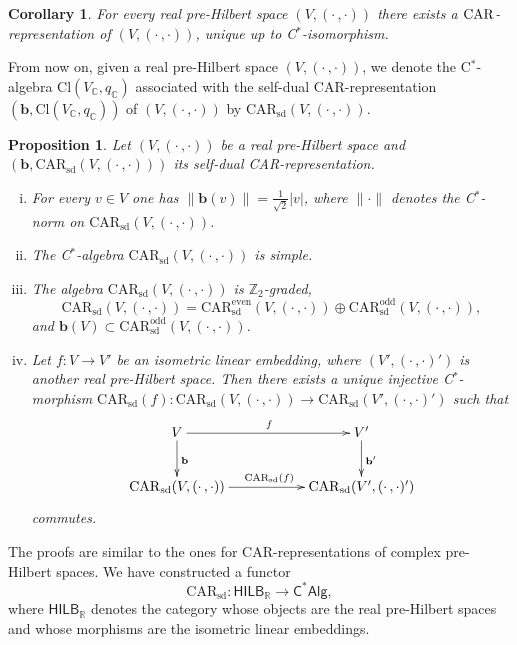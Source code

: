 \documentclass[a4paper,11pt]{amsart}
\newtheorem{cor}[thm]{Corollary}
\newtheorem{prop}[thm]{Proposition}
\theoremstyle{definition}
\begin{document}
\begin{cor}\label{csdCAR}
For every real pre-Hilbert space $(V,(\cdot\,,\cdot))$ there exists a ${\rm CAR}$-representation of $(V,(\cdot\,,\cdot))$, unique up to {\mbox{C$^*$}}-isomorphism.
\end{cor}

From now on, given a real pre-Hilbert space $(V,(\cdot\,,\cdot))$, we denote  the {\mbox{C$^*$}}-algebra $\mathrm{Cl}(V_{\mathbb{C}},q_{\mathbb{C}})$ associated with the self-dual $\mathrm{CAR}$-representation $({\mathbf{b}},\mathrm{Cl}(V_{\mathbb{C}},q_{\mathbb{C}}))$ of $(V,(\cdot\,,\cdot))$ by $\mathrm{CAR}_\mathrm{sd}(V,(\cdot\,,\cdot))$.

\begin{prop}\label{psdCAR}
Let $(V,(\cdot\,,\cdot))$ be a real pre-Hilbert space and  $({\mathbf{b}},\mathrm{CAR}_\mathrm{sd}(V,(\cdot\,,\cdot)))$ its self-dual {\rm CAR}-representation.
\begin{enumerate}[(i)]
\item\label{psdCAR:1}
For every $v\in V$ one has $\|{\mathbf{b}}(v)\|=\frac{1}{\sqrt 2}|v|$, where $\|\cdot\|$ denotes the {\mbox{C$^*$}}-norm on $\mathrm{CAR}_\mathrm{sd}(V,(\cdot\,,\cdot))$.
\item \label{psdCAR:2}
The {\mbox{C$^*$}}-algebra $\mathrm{CAR}_\mathrm{sd}(V,(\cdot\,,\cdot))$ is simple.
\item \label{psdCAR:4}
The algebra $\mathrm{CAR}_\mathrm{sd}(V,(\cdot\,,\cdot))$ is ${\mathbb{Z}}_2$-graded, 
$$
\mathrm{CAR}_\mathrm{sd}(V,(\cdot\,,\cdot))=\mathrm{CAR}^\mathrm{even}_\mathrm{sd}(V,(\cdot\,,\cdot))\oplus\mathrm{CAR}^\mathrm{odd}_\mathrm{sd}(V,(\cdot\,,\cdot)),
$$ 
and ${\mathbf{b}}(V) \subset \mathrm{CAR}^\mathrm{odd}_\mathrm{sd}(V,(\cdot\,,\cdot))$.
\item \label{psdCAR:3}
Let $f:V\to V'$ be an isometric linear embedding, where $(V',(\cdot\,,\cdot)')$ is another real pre-Hilbert space.
Then there exists a unique injective {\mbox{C$^*$}}-morphism $\mathrm{CAR}_\mathrm{sd}(f):\mathrm{CAR}_\mathrm{sd}(V,(\cdot\,,\cdot))\to\mathrm{CAR}_\mathrm{sd}(V',(\cdot\,,\cdot)')$ such that 
$$
\xymatrix{
V\ar[rr]^{f}\ar[d]^{\mathbf{b}}
&&V' \ar[d]^{{\mathbf{b}}'}\\
\mathrm{CAR}_\mathrm{sd}(V,(\cdot\,,\cdot))\ar[rr]^{\mathrm{CAR}_\mathrm{sd}(f)}
&&\mathrm{CAR}_\mathrm{sd}(V',(\cdot\,,\cdot)')
}
$$
commutes.
\end{enumerate}
\end{prop}

The proofs are similar to the ones for CAR-representations of complex pre-Hilbert spaces.
We have constructed a functor
\[\mathrm{CAR}_\mathrm{sd}:{\mathsf{HILB}_{\mathbb{R}}}\longrightarrow{\mathsf{C^*Alg}},\]
where ${\mathsf{HILB}_{\mathbb{R}}}$ denotes the category whose objects are the real pre-Hilbert spaces and whose morphisms are the isometric linear embeddings.
\end{document}
